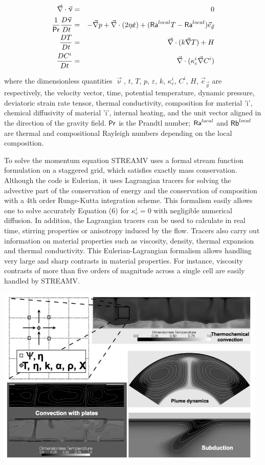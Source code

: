 \begin{eqnarray}
\vec\nabla \cdot \vec\upnu &=& 0 \\
\frac{1}{{\mathsf{Pr}}} \frac{D \vec\upnu}{Dt} 
&=& -\vec\nabla p +\vec\nabla \cdot (2\eta\dot{\bm \varepsilon} )
+ ({\mathsf{Ra}}^{local} T - {\mathsf{Ra}}^{local} )\vec{e}_{\vec g}   \\
\frac{DT}{Dt} &=& \vec\nabla \cdot (k \vec\nabla T) + H \\
\frac{DC^i}{Dt} &=& \vec\nabla \cdot (\kappa_c^i \vec\nabla C^i )  
\end{eqnarray}

where the dimensionless quantities $\vec\upnu$, $t$, $T$, $p$, 
$\varepsilon$, $k$, $\kappa_c^i$, $C^i$, $H$, $\vec{e}_{\vec g}$ 
are respectively, the velocity
vector, time, potential temperature, dynamic pressure, deviatoric strain rate tensor, thermal
conductivity, composition for material 'i', chemical diffusivity of material 'i', internal
heating, and the unit vector aligned in the direction of the gravity field. ${\mathsf{Pr}}$ 
is the Prandtl number;
${\mathsf{Ra}}^{local}$ and ${\mathsf{Rb}}^{local}$ are thermal and compositional Rayleigh numbers 
depending on the local composition.

To solve the momentum equation STREAMV uses a formal stream function formulation on
a staggered grid, which satisfies exactly mass conservation. Although the
code is Eulerian, it uses Lagrangian tracers for solving the advective part of the conservation
of energy and the conservation of composition with a 4th order Runge-Kutta integration
scheme. This formalism easily allows one to solve accurately Equation (6) for $\kappa_c^i=0$ with
negligible numerical diffusion. In addition, the Lagrangian tracers can be used to calculate in
real time, stirring properties or anisotropy induced by the flow. Tracers also carry out
information on material properties such as viscosity, density, thermal expansion and thermal
conductivity. This Eulerian-Lagrangian formalism allows handling very large and sharp
contrasts in material properties. For instance, viscosity contrasts of more than five orders of
magnitude across a single cell are easily handled by STREAMV.

\includegraphics[width=13cm]{images/codes/streamV}

